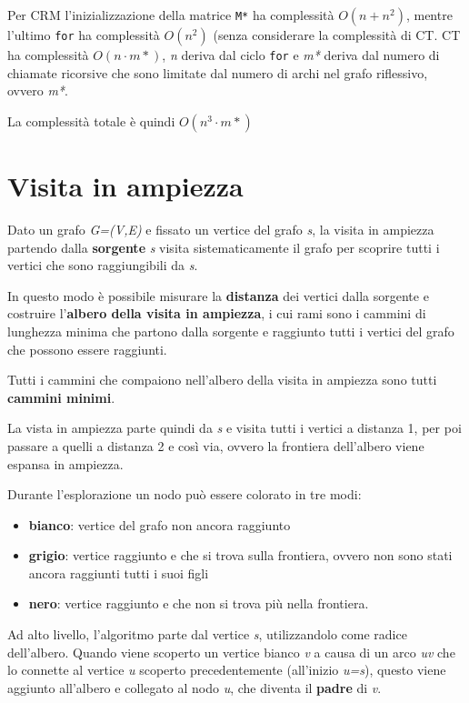 Per \textsc{CRM} l'inizializzazione della matrice \texttt{M*} ha
complessità $O(n+n^2)$, mentre l'ultimo
\texttt{for} ha complessità $O(n^2)$ (senza considerare la complessità
di \textsc{CT}. \textsc{CT} ha complessità $O(n \cdot m* )$, \emph{n}
deriva dal ciclo \texttt{for} e \emph{m*} deriva dal numero di chiamate
ricorsive che sono limitate dal numero di archi nel grafo riflessivo,
ovvero \emph{m*}.

La complessità totale è quindi $O(n^3 \cdot m*)$

\section{Visita in ampiezza}\label{visita-in-ampiezza}

Dato un grafo \emph{G=(V,E)} e fissato un vertice del grafo \emph{s}, la
visita in ampiezza partendo dalla \textbf{sorgente} \emph{s} visita
sistematicamente il grafo per scoprire tutti i vertici che sono
raggiungibili da \emph{s}.

In questo modo è possibile misurare la \textbf{distanza} dei vertici
dalla sorgente e costruire l'\textbf{albero della visita in ampiezza}, i
cui rami sono i cammini di lunghezza minima che partono dalla sorgente e
raggiunto tutti i vertici del grafo che possono essere raggiunti.

Tutti i cammini che compaiono nell'albero della visita in ampiezza sono
tutti \textbf{cammini minimi}.

La vista in ampiezza parte quindi da \emph{s} e visita tutti i vertici a
distanza 1, per poi passare a quelli a distanza 2 e così via, ovvero la
frontiera dell'albero viene espansa in ampiezza.

Durante l'esplorazione un nodo può essere colorato in tre modi:

\begin{itemize}
\item
  \textbf{bianco}: vertice del grafo non ancora raggiunto
\item
  \textbf{grigio}: vertice raggiunto e che si trova sulla frontiera,
  ovvero non sono stati ancora raggiunti tutti i suoi figli
\item
  \textbf{nero}: vertice raggiunto e che non si trova più nella
  frontiera.
\end{itemize}

Ad alto livello, l'algoritmo parte dal vertice \emph{s}, utilizzandolo
come radice dell'albero. Quando viene scoperto un vertice bianco
\emph{v} a causa di un arco \emph{uv} che lo connette al vertice \emph{u}
scoperto precedentemente (all'inizio \emph{u=s}), questo viene aggiunto
all'albero e collegato al nodo \emph{u}, che diventa il \textbf{padre}
di \emph{v}.

